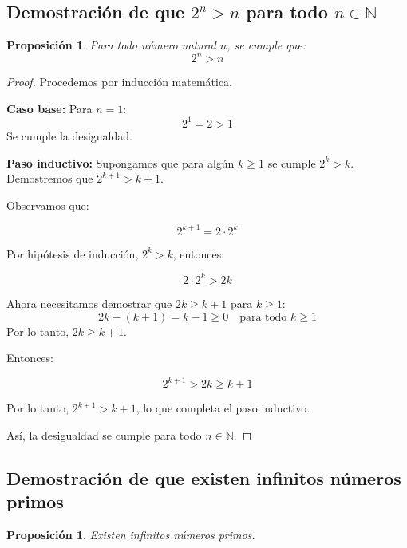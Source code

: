 \documentclass[12pt,final]{report}
\theoremstyle{plain}
\newtheorem{proposition}[theorem]{Proposición}
\theoremstyle{definition}
\begin{document}
\newpage

\subsection{Demostración de que $2^n > n$ para todo $n \in \mathbb{N}$}

\begin{proposition}
Para todo número natural $n$, se cumple que:
\[
2^n > n
\]
\end{proposition}

\begin{proof}

Procedemos por inducción matemática.

\textbf{Caso base:} Para $n = 1$:
\[
2^1 = 2 > 1
\]
Se cumple la desigualdad.

\textbf{Paso inductivo:} Supongamos que para algún $k \geq 1$ se cumple $2^k > k$. Demostremos que $2^{k+1} > k+1$.

Observamos que:

\[
2^{k+1} = 2 \cdot 2^k
\]

Por hipótesis de inducción, $2^k > k$, entonces:

\[
2 \cdot 2^k > 2k
\]

Ahora necesitamos demostrar que $2k \geq k+1$ para $k \geq 1$:
\[
2k - (k+1) = k - 1 \geq 0 \quad \text{para todo } k \geq 1
\]
Por lo tanto, $2k \geq k+1$.

Entonces:

\[
2^{k+1} > 2k \geq k+1
\]

Por lo tanto, $2^{k+1} > k+1$, lo que completa el paso inductivo.

Así, la desigualdad se cumple para todo $n \in \mathbb{N}$.

\end{proof}

\newpage

\subsection{Demostración de que existen infinitos números primos}

\begin{proposition}
Existen infinitos números primos.
\end{proposition}
\end{document}
